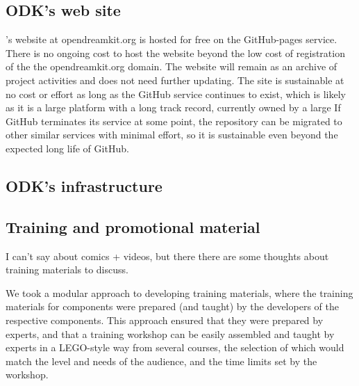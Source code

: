 \documentclass{deliverablereport}
\begin{document}
\subsection{ODK's web site}

\ODK's website at opendreamkit.org is hosted for free on the GitHub-pages service.
There is no ongoing cost to host the website beyond the low cost of registration of the the opendreamkit.org domain.
The \ODK website will remain as an archive of project activities and does not need further updating.
The site is sustainable at no cost or effort as long as the GitHub service continues to exist,
which is likely as it is a large platform with a long track record, currently owned by a large
If GitHub terminates its service at some point,
the repository can be migrated to other similar services with minimal effort,
so it is sustainable even beyond the expected long life of GitHub.


\subsection{ODK's infrastructure}


\subsection{Training and promotional material}

I can't say about comics + videos, but there there are some thoughts about training materials to discuss.

We took a modular approach to developing training materials,
where the training materials for \ODK components were prepared
(and taught) by the developers of the respective components. 
This approach ensured that they were prepared by experts, and 
that a training workshop can be easily assembled and taught by
experts in a LEGO-style way from several courses, the selection
of which would match the level and needs of the audience, and the 
time limits set by the workshop.
\end{document}
